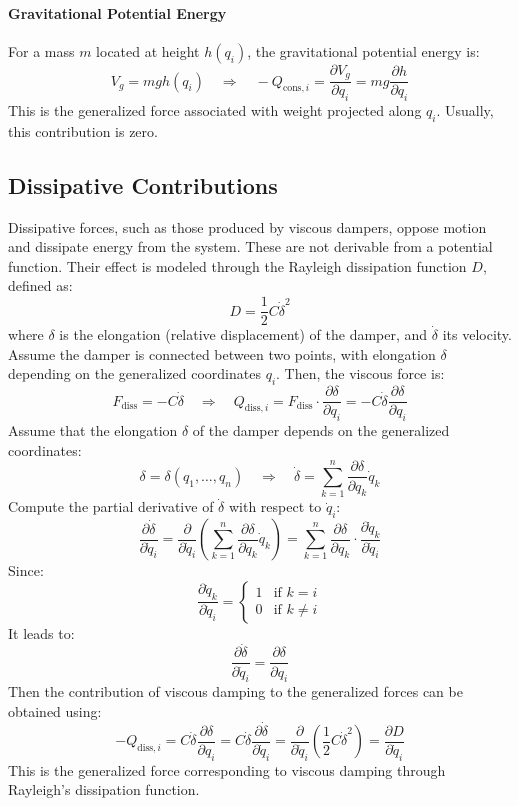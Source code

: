 \paragraph{Gravitational Potential Energy}

For a mass \( m \) located at height \( h(q_i) \), the gravitational potential energy is:
\[
V_g = m g h(q_i) \quad \Rightarrow \quad - Q_{\text{cons},i} = \frac{\partial V_g}{\partial q_i} = m g \frac{\partial h}{\partial q_i}
\]
This is the generalized force associated with weight projected along \( q_i \). Usually, this contribution is zero.

\subsection{Dissipative Contributions}

Dissipative forces, such as those produced by viscous dampers, oppose motion and dissipate energy from the system. These are not derivable from a potential function. Their effect is modeled through the Rayleigh dissipation function \( D \), defined as:
\[
D = \frac{1}{2} C \dot{\delta}^2
\]
where \( \delta \) is the elongation (relative displacement) of the damper, and \( \dot{\delta} \) its velocity. Assume the damper is connected between two points, with elongation \( \delta \) depending on the generalized coordinates \( q_i \). Then, the viscous force is:
\[
F_{\text{diss}} = -C \dot{\delta}
\quad \Rightarrow \quad
Q_{\text{diss},i} = F_{\text{diss}} \cdot \frac{\partial \delta}{\partial q_i} = -C \dot{\delta} \frac{\partial \delta}{\partial q_i}
\]
Assume that the elongation \( \delta \) of the damper depends on the generalized coordinates:
\[
\delta = \delta(q_1, \dots, q_n)
\quad \Rightarrow \quad
\dot{\delta} = \sum_{k=1}^n \frac{\partial \delta}{\partial q_k} \dot{q}_k
\]
Compute the partial derivative of \( \dot{\delta} \) with respect to \( \dot{q}_i \):
\[
\frac{\partial \dot{\delta}}{\partial \dot{q}_i}
= \frac{\partial}{\partial \dot{q}_i} \left( \sum_{k=1}^n \frac{\partial \delta}{\partial q_k} \dot{q}_k \right)
= \sum_{k=1}^n \frac{\partial \delta}{\partial q_k} \cdot \frac{\partial \dot{q}_k}{\partial \dot{q}_i}
\]
Since:
\[
\frac{\partial \dot{q}_k}{\partial \dot{q}_i} =
\begin{cases}
1 & \text{if } k = i \\
0 & \text{if } k \neq i
\end{cases}
\]
It leads to:
\[
\frac{\partial \dot{\delta}}{\partial \dot{q}_i} = \frac{\partial \delta}{\partial q_i}
\]
Then the contribution of viscous damping to the generalized forces can be obtained using:
\[
-Q_{\text{diss},i} 
= C \dot{\delta} \frac{\partial \delta}{\partial q_i} 
= C \dot{\delta} \frac{\partial \dot{\delta}}{\partial \dot{q}_i}
= \frac{\partial}{\partial \dot{q}_i} \left( \frac{1}{2} C \dot{\delta}^2 \right)
= \frac{\partial D}{\partial \dot{q}_i}
\]
This is the generalized force corresponding to viscous damping through Rayleigh's dissipation function.

